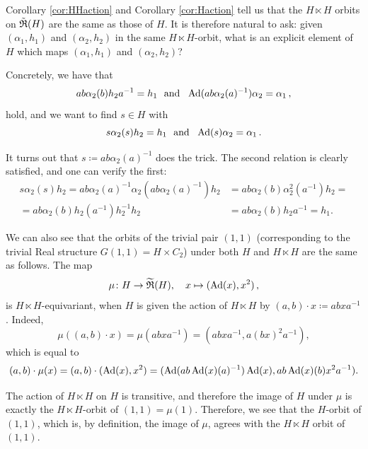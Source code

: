 \begin{remark}
Corollary \ref{cor:HHaction} and Corollary \ref{cor:Haction} tell us that the $H \ltimes H$ orbits on $\tilde{{\mathfrak R}}(H)$ are the same as those of $H$. It is therefore natural to ask: given $(\alpha_1, h_1)$ and $(\alpha_2, h_2)$ in the same $H \ltimes H$-orbit, what is an explicit element of $H$ which maps $(\alpha_1, h_1)$ and $(\alpha_2, h_2)$?

Concretely, we have that
\begin{equation}\label{copycopyH2action}
  a b  \alpha_2(b) h_2 a^{-1} = h_1
  \ \mbox{ and } \ 
    \Ad(a b  \alpha_2(a)^{-1}) \alpha_2 = \alpha_1 \, ,
\end{equation}
hold, and we want to find $s \in H$ with
\begin{equation}\label{copycopyH2action2}
  s  \alpha_2(s) h_2  = h_1
  \ \mbox{ and } \ 
    \Ad(s) \alpha_2 = \alpha_1 \, .
\end{equation} 

It turns out that $s \coloneqq a b  \alpha_2(a)^{-1}$ does the trick. The second relation is clearly satisfied, and one can verify the first:
\begin{align*}
         s  \alpha_2(s) h_2  = a b  \alpha_2(a)^{-1}\alpha_2(a b  \alpha_2(a)^{-1}) h_2  & = 
         a b  \alpha_2(b)  \alpha^2_2(a^{-1}) h_2  = \\
         = a b  \alpha_2(b)  h_2 (a^{-1}) h_2^{-1} h_2 &
         = a b  \alpha_2(b)  h_2 a^{-1} = h_1.
  \end{align*}  
  \end{remark}

\begin{eg}
We can also see that the orbits of the trivial pair $(1,1)$ (corresponding to the trivial Real structure $G(1,1) = H \times C_2$) under both $H$ and $H \ltimes H$ are the same as follows. The map
\[
\mu \colon H \rightarrow \widetilde{{\mathfrak R}}(H), \quad x \mapsto ( \operatorname{Ad} (x),x^2)\, ,
\]
is $H \ltimes H$-equivariant, when $H$ is given the action of $H \ltimes H$ by $(a,b) \cdot x \coloneqq abxa^{-1}$. Indeed, 
\[
\mu((a,b) \cdot x) = \mu(abxa^{-1}) = (abxa^{-1}, a (bx)^2 a^{-1}),
\]
which is equal to
\[
(a, b) \cdot \mu(x) = (a,b) \cdot (\operatorname{Ad} (x),x^2) = (\operatorname{Ad}(ab\operatorname{Ad}(x)(a)^{-1})\operatorname{Ad}(x), ab \operatorname{Ad}(x)(b)x^2a^{-1}).
\]

The action of $H \ltimes H$ on $H$ is transitive, and therefore the image of $H$ under $\mu$ is exactly the $H \ltimes H$-orbit of $(1,1) = \mu(1)$. Therefore, we see that the $H$-orbit of $(1,1)$, which is, by definition, the image of $\mu$, agrees with the $H \ltimes H$ orbit of $(1,1)$.
\end{eg}

